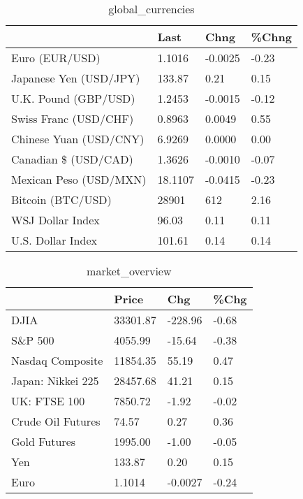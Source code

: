 \documentclass{article}%
\begin{document}
%


\begin{table}[htbp]%
\caption{global\_currencies}%
\centering%
\begin{adjustbox}{width=1\textwidth}%
\begin{tabular}{llll}
\toprule
                       &    Last &    Chng & \%Chng \\
\midrule
        Euro (EUR/USD) &  1.1016 & -0.0025 & -0.23 \\
Japanese Yen (USD/JPY) &  133.87 &    0.21 &  0.15 \\
  U.K. Pound (GBP/USD) &  1.2453 & -0.0015 & -0.12 \\
 Swiss Franc (USD/CHF) &  0.8963 &  0.0049 &  0.55 \\
Chinese Yuan (USD/CNY) &  6.9269 &  0.0000 &  0.00 \\
  Canadian \$ (USD/CAD) &  1.3626 & -0.0010 & -0.07 \\
Mexican Peso (USD/MXN) & 18.1107 & -0.0415 & -0.23 \\
     Bitcoin (BTC/USD) &   28901 &     612 &  2.16 \\
      WSJ Dollar Index &   96.03 &    0.11 &  0.11 \\
     U.S. Dollar Index &  101.61 &    0.14 &  0.14 \\
\bottomrule
\end{tabular}
%
\end{adjustbox}%
\end{table}

%


\begin{table}[htbp]%
\caption{market\_overview}%
\centering%
\begin{adjustbox}{width=1\textwidth}%
\begin{tabular}{llll}
\toprule
                  &    Price &     Chg &  \%Chg \\
\midrule
             DJIA & 33301.87 & -228.96 & -0.68 \\
          S\&P 500 &  4055.99 &  -15.64 & -0.38 \\
 Nasdaq Composite & 11854.35 &   55.19 &  0.47 \\
Japan: Nikkei 225 & 28457.68 &   41.21 &  0.15 \\
     UK: FTSE 100 &  7850.72 &   -1.92 & -0.02 \\
Crude Oil Futures &    74.57 &    0.27 &  0.36 \\
     Gold Futures &  1995.00 &   -1.00 & -0.05 \\
              Yen &   133.87 &    0.20 &  0.15 \\
             Euro &   1.1014 & -0.0027 & -0.24 \\
\bottomrule
\end{tabular}
%
\end{adjustbox}%
\end{table}

%
\end{document}
